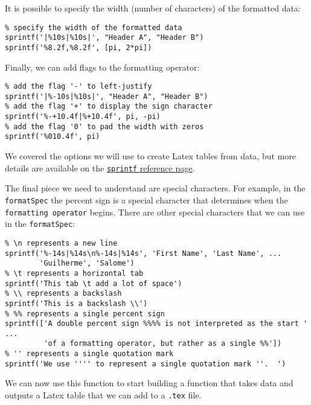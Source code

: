 \documentclass[12pt, a4paper]{article}
\begin{document}
It is possible to specify the width (number of characters) of the formatted data:
\lstset{language=matlab,label= ,caption= ,captionpos=b,firstnumber=1,numbers=left,style=Matlab-editor}
\begin{lstlisting}
% specify the width of the formatted data
sprintf('|%10s|%10s|', "Header A", "Header B")
sprintf('%8.2f,%8.2f', [pi, 2*pi])
\end{lstlisting}

Finally, we can add flags to the formatting operator:
\lstset{language=matlab,label= ,caption= ,captionpos=b,firstnumber=1,numbers=left,style=Matlab-editor}
\begin{lstlisting}
% add the flag '-' to left-justify
sprintf('|%-10s|%10s|', "Header A", "Header B")
% add the flag '+' to display the sign character
sprintf('%-+10.4f|%+10.4f', pi, -pi)
% add the flag '0' to pad the width with zeros
sprintf('%010.4f', pi)
\end{lstlisting}

We covered the options we will use to create Latex tables from data, but more details are available on the \href{https://www.mathworks.com/help/matlab/ref/sprintf.html\#btf\_bfy-1\_sep\_shared-formatSpec}{\texttt{sprintf} reference page}.

The final piece we need to understand are special characters.
For example, in the \texttt{formatSpec} the percent sign is a special character that determines when the \texttt{formatting operator} begins.
There are other special characters that we can use in the \texttt{formatSpec}:
\lstset{language=matlab,label= ,caption= ,captionpos=b,firstnumber=1,numbers=left,style=Matlab-editor}
\begin{lstlisting}
% \n represents a new line
sprintf('%-14s|%14s\n%-14s|%14s', 'First Name', 'Last Name', ...
        'Guilherme', 'Salome')
% \t represents a horizontal tab
sprintf('This tab \t add a lot of space')
% \\ represents a backslash
sprintf('This is a backslash \\')
% %% represents a single percent sign
sprintf(['A double percent sign %%%% is not interpreted as the start ' ...
         'of a formatting operator, but rather as a single %%'])
% '' represents a single quotation mark
sprintf('We use '''' to represent a single quotation mark ''.  ')
\end{lstlisting}

We can now use this function to start building a function that takes data and outputs a Latex table that we can add to a \texttt{.tex} file.
\end{document}
